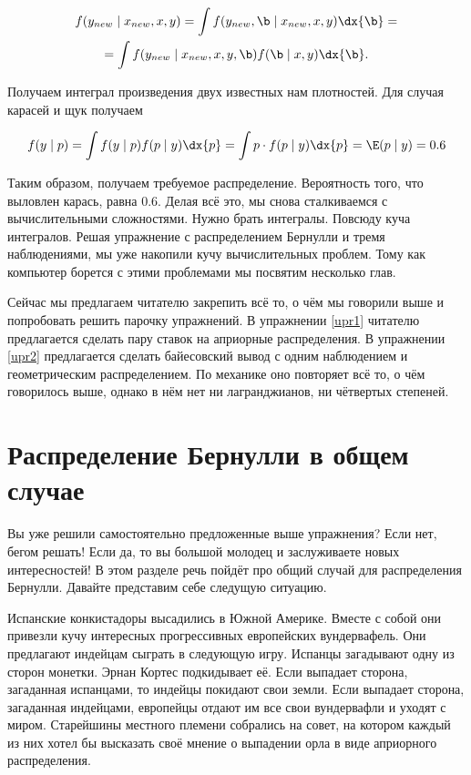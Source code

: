 \begin{multline*}
f(y_{new} \mid x_{new},x, y) =\int f(y_{new}, \b \mid x_{new}, x,y) \dx{\b} = \\ =  \int f(y_{new} \mid x_{new}, x,y,\b) f(\b \mid x,y) \dx{\b}.
\end{multline*}


Получаем интеграл произведения двух известных нам плотностей. Для случая карасей и щук получаем

\[    
f(y \mid p) = \int f(y \mid p) f(p \mid y) \dx{p} = \int p \cdot f(p \mid y) \dx{p} = \E(p \mid y) = 0.6
\]

Таким образом, получаем требуемое распределение. Вероятность того, что выловлен карась, равна $0.6$. Делая всё это, мы снова сталкиваемся с вычислительными сложностями. Нужно брать интегралы. Повсюду куча интегралов. Решая упражнение с распределением Бернулли и тремя наблюдениями, мы уже накопили кучу вычислительных проблем. Тому как компьютер борется с этими проблемами мы посвятим несколько глав.

Сейчас мы предлагаем читателю закрепить всё то, о чём мы говорили выше и попробовать решить парочку упражнений. В упражнении \ref{upr1}  читателю предлагается сделать пару ставок на априорные распределения. В упражнении \ref{upr2} предлагается сделать байесовский вывод с одним наблюдением и геометрическим распределением. По механике оно повторяет всё то, о чём говорилось выше, однако в нём нет ни лагранджианов, ни чётвертых степеней. 

\section{Распределение Бернулли в общем случае} 

Вы уже решили самостоятельно предложенные выше упражнения? Если нет, бегом решать! Если да, то вы большой молодец и заслуживаете новых интересностей! В этом разделе речь пойдёт про общий случай для распределения Бернулли. Давайте представим себе следущую ситуацию. 

Испанские конкистадоры высадились в Южной Америке. Вместе с собой они привезли кучу интересных прогрессивных европейских вундервафель. Они предлагают индейцам сыграть в следующую игру. Испанцы загадывают одну из сторон монетки. Эрнан Кортес подкидывает её. Если выпадает сторона, загаданная испанцами, то индейцы покидают свои земли. Если выпадает сторона, загаданная индейцами, европейцы отдают им все свои вундервафли и уходят с миром. Старейшины местного племени собрались на совет, на котором каждый из них хотел бы высказать своё мнение о выпадении орла в виде априорного распределения. 

